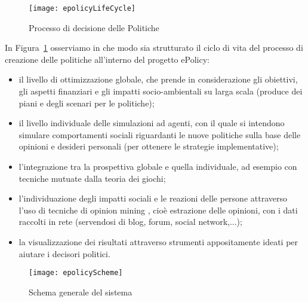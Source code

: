 \documentclass[12pt,a4paper,openright,twoside]{report}
\begin{document}
\begin{figure}[hbt]
	\centering
	\texttt{[image: epolicyLifeCycle]}
	\caption{Processo di decisione delle Politiche}
	\label{epolicyLifeCycle}
\end{figure}

In Figura~\ref{epolicyLifeCycle} osserviamo in che modo sia strutturato il ciclo di vita del processo di creazione delle politiche all'interno del progetto ePolicy: \begin{itemize}
\item il livello di ottimizzazione globale, che prende in considerazione gli obiettivi, gli aspetti finanziari e gli impatti socio-ambientali su larga scala (produce dei piani e degli scenari per le politiche);
\item il livello individuale delle simulazioni ad agenti, con il quale si intendono simulare  comportamenti sociali riguardanti le nuove politiche sulla base delle opinioni e desideri personali (per ottenere le strategie implementative);
\item  l'integrazione tra la prospettiva globale e quella individuale, ad esempio con tecniche mutuate dalla teoria dei giochi;
\item l'individuazione degli impatti sociali e le reazioni delle persone attraverso l'uso di tecniche di opinion mining , cioè estrazione delle opinioni, con i dati raccolti in rete (servendosi di blog, forum, social network,...);
\item la visualizzazione dei risultati attraverso strumenti appositamente ideati per aiutare i decisori politici.
\end{itemize}


\begin{figure}[hbt]
	\centering
	\texttt{[image: epolicyScheme]}
	\caption{Schema generale del sistema}
	\label{epolicyScheme}
\end{figure}
\end{document}
